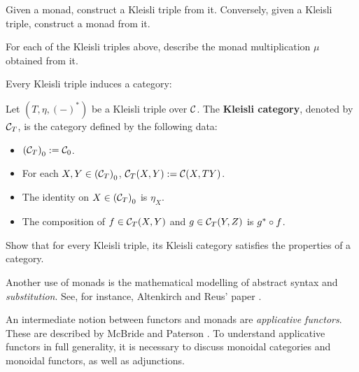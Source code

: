\begin{exer} Given a monad, construct a Kleisli triple from it.
Conversely, given a Kleisli triple, construct a monad from it.
\end{exer}

\begin{exer}
  For each of the Kleisli triples above, describe the monad multiplication $\mu$ obtained from it.
\end{exer}

Every Kleisli triple induces a category:
\begin{dfn} Let $(T,\eta, (-)^{*})$ be a Kleisli triple over $\CC$. The \textbf{Kleisli category}, denoted by $\CC_{T}$, is the category defined by the following data:
\begin{itemize}
\item $\Ob{(\CC_T)} := \Ob{\CC}$.
\item For each $X,Y\in\Ob{(\CC_T)}$, $\CHom{\CC_T}{X}{Y} := \CHom{\CC}{X}{TY}$.
\item The identity on $X\in\Ob{(\CC_T)}$ is $\eta_X$.
\item The composition of $f\in \CHom{\CC_T}{X}{Y}$ and $g\in \CHom{\CC_T}{Y}{Z}$ is $\co{f}{g^{*}}$.
\end{itemize}
\end{dfn}

\begin{exer} Show that for every Kleisli triple, its Kleisli category satisfies the properties of a category.
\end{exer}

\begin{reading*}
  Another use of monads is the mathematical modelling of abstract syntax and \emph{substitution}.
  See, for instance, Altenkirch and Reus' paper \cite{DBLP:conf/csl/AltenkirchR99}.

  An intermediate notion between functors and monads are \emph{applicative functors}. These are described by McBride and Paterson \cite{DBLP:journals/jfp/McbrideP08}.
  To understand applicative functors in full generality, it is necessary to discuss monoidal categories and monoidal functors, as well as adjunctions.
\end{reading*}

